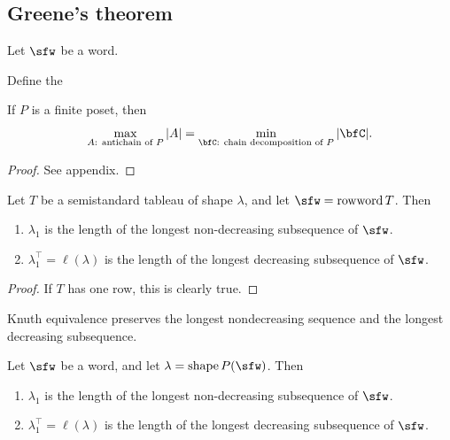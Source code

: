 \documentclass{article}
\DeclareMathOperator{\shape}{shape}
\DeclareMathOperator{\rowword}{rowword}
\begin{document}
\subsection{Greene's theorem}

\begin{definition}
    Let $\sfw$ be a word.
\end{definition}

\begin{lemma}
\end{lemma}

Define the 
\begin{theorem}
    \label{thm:Dilworth}
    If $P$ is a finite poset, then 
    \[
        \max_\text{$A$: antichain of $P$}
        |A|
        =
        \min_\text{$\bfC$: chain decomposition of $P$}
        |\bfC|.
    \]
\end{theorem}

\begin{proof}
    See appendix.
\end{proof}

\begin{corollary}
    Let $T$ be a semistandard tableau of shape $\lambda$, and let $\sfw = \rowword T$.
    Then
    \begin{enumerate}[label=(\alph*)]
        \item 
            $\lambda_1$ is the length of the longest non-decreasing subsequence of $\sfw$.
        \item 
            $\lambda^\top_1 = \ell(\lambda)$ is the length of the longest decreasing subsequence of $\sfw$.
    \end{enumerate}
\end{corollary}

\begin{proof}
    If $T$ has one row, this is clearly true.
\end{proof}

\begin{theorem}
    Knuth equivalence preserves the longest nondecreasing sequence and the longest decreasing subsequence.
\end{theorem}

\begin{corollary}
    Let $\sfw$ be a word, and let $\lambda = \shape P(\sfw)$.
    Then 
    \begin{enumerate}[label=(\alph*)]
        \item 
            $\lambda_1$ is the length of the longest non-decreasing subsequence of $\sfw$.
        \item 
            $\lambda^\top_1 = \ell(\lambda)$ is the length of the longest decreasing subsequence of $\sfw$.
    \end{enumerate}
\end{corollary}
\end{document}
